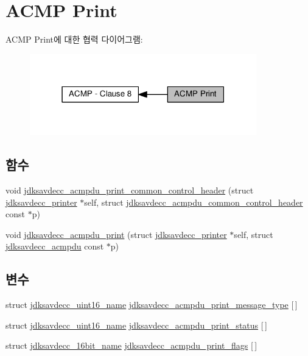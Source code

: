 \hypertarget{group__acmp__print}{}\section{A\+C\+MP Print}
\label{group__acmp__print}
A\+C\+MP Print에 대한 협력 다이어그램\+:
\nopagebreak
\begin{figure}[H]
\begin{center}
\leavevmode
\includegraphics[width=279pt]{group__acmp__print}
\end{center}
\end{figure}
\subsection*{함수}
\begin{DoxyCompactItemize}
\item 
void \hyperlink{group__acmp__print_ga59ff2d8effe67485e7e29789dc92627e}{jdksavdecc\+\_\+acmpdu\+\_\+print\+\_\+common\+\_\+control\+\_\+header} (struct \hyperlink{structjdksavdecc__printer}{jdksavdecc\+\_\+printer} $\ast$self, struct \hyperlink{structjdksavdecc__acmpdu__common__control__header}{jdksavdecc\+\_\+acmpdu\+\_\+common\+\_\+control\+\_\+header} const $\ast$p)
\item 
void \hyperlink{group__acmp__print_gad8b48fdf87c13601d151977afba5d7fc}{jdksavdecc\+\_\+acmpdu\+\_\+print} (struct \hyperlink{structjdksavdecc__printer}{jdksavdecc\+\_\+printer} $\ast$self, struct \hyperlink{structjdksavdecc__acmpdu}{jdksavdecc\+\_\+acmpdu} const $\ast$p)
\end{DoxyCompactItemize}
\subsection*{변수}
\begin{DoxyCompactItemize}
\item 
struct \hyperlink{structjdksavdecc__uint16__name}{jdksavdecc\+\_\+uint16\+\_\+name} \hyperlink{group__acmp__print_gac8bc1b2ddf5d5788ef9846be06446b2f}{jdksavdecc\+\_\+acmpdu\+\_\+print\+\_\+message\+\_\+type} \mbox{[}$\,$\mbox{]}
\item 
struct \hyperlink{structjdksavdecc__uint16__name}{jdksavdecc\+\_\+uint16\+\_\+name} \hyperlink{group__acmp__print_ga9d62c7c54ab6eb010490acdf16d8c57f}{jdksavdecc\+\_\+acmpdu\+\_\+print\+\_\+status} \mbox{[}$\,$\mbox{]}
\item 
struct \hyperlink{structjdksavdecc__16bit__name}{jdksavdecc\+\_\+16bit\+\_\+name} \hyperlink{group__acmp__print_gae4346c62b401222d113a73dc5f5f3cfe}{jdksavdecc\+\_\+acmpdu\+\_\+print\+\_\+flags} \mbox{[}$\,$\mbox{]}
\end{DoxyCompactItemize}


